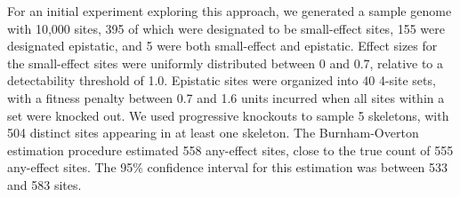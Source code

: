 For an initial experiment exploring this approach, we generated a sample genome with 10,000 sites, 395 of which were designated to be small-effect sites, 155 were designated epistatic, and 5 were both small-effect and epistatic.
Effect sizes for the small-effect sites were uniformly distributed between 0 and 0.7, relative to a detectability threshold of 1.0.
Epistatic sites were organized into 40 4-site sets, with a fitness penalty between 0.7 and 1.6 units incurred when all sites within a set were knocked out.
We used progressive knockouts to sample 5 skeletons, with 504 distinct sites appearing in at least one skeleton.
The Burnham-Overton estimation procedure estimated 558 any-effect sites, close to the true count of 555 any-effect sites.
The 95\% confidence interval for this estimation was between 533 and 583 sites.









